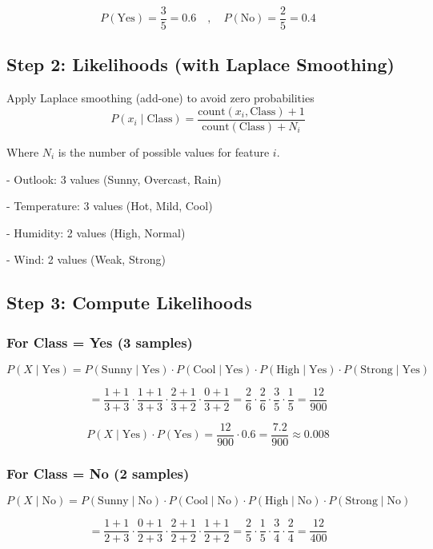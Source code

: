 \documentclass{article}
\begin{document}
$$
P(\text{Yes}) = \frac{3}{5} = 0.6
\quad , \quad
P(\text{No}) = \frac{2}{5} = 0.4
$$

\subsection*{Step 2: Likelihoods (with Laplace Smoothing)}

Apply Laplace smoothing (add-one) to avoid zero probabilities
$$
P(x_i \mid \text{Class}) = \frac{\text{count}(x_i, \text{Class}) + 1}{\text{count}(\text{Class}) + N_i}
$$

Where $N_i$ is the number of possible values for feature $i$.

- Outlook: 3 values (Sunny, Overcast, Rain)

- Temperature: 3 values (Hot, Mild, Cool)

- Humidity: 2 values (High, Normal)

- Wind: 2 values (Weak, Strong)

\subsection*{Step 3: Compute Likelihoods}

\subsubsection*{For Class = Yes (3 samples)}

$$
P(X \mid \text{Yes}) = P(\text{Sunny} \mid \text{Yes}) \cdot P(\text{Cool} \mid \text{Yes}) \cdot P(\text{High} \mid \text{Yes}) \cdot P(\text{Strong} \mid \text{Yes})
$$

$$
= \frac{1+1}{3+3} \cdot \frac{1+1}{3+3} \cdot \frac{2+1}{3+2} \cdot \frac{0+1}{3+2}
= \frac{2}{6} \cdot \frac{2}{6} \cdot \frac{3}{5} \cdot \frac{1}{5} = \frac{12}{900}
$$

$$
P(X \mid \text{Yes}) \cdot P(\text{Yes}) = \frac{12}{900} \cdot 0.6 = \frac{7.2}{900} \approx 0.008
$$

\subsubsection*{For Class = No (2 samples)}

$$
P(X \mid \text{No}) = P(\text{Sunny} \mid \text{No}) \cdot P(\text{Cool} \mid \text{No}) \cdot P(\text{High} \mid \text{No}) \cdot P(\text{Strong} \mid \text{No})
$$

$$
= \frac{1+1}{2+3} \cdot \frac{0+1}{2+3} \cdot \frac{2+1}{2+2} \cdot \frac{1+1}{2+2}
= \frac{2}{5} \cdot \frac{1}{5} \cdot \frac{3}{4} \cdot \frac{2}{4} = \frac{12}{400}
$$
\end{document}

